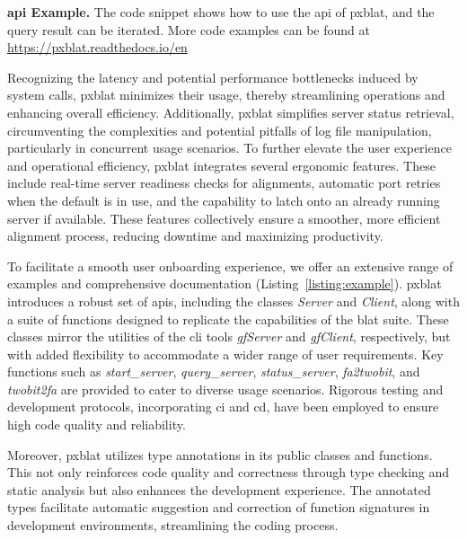 \documentclass[10pt,letterpaper]{article}
\begin{document}
\begin{listing}
	\inputminted[breaklines]{python}{code/example1.py}
	\caption{{\bf \gls{api} Example.} The code snippet shows how to use the \gls{api} of \gls{pxblat},
		and the query result can be iterated. More code examples can be found at \url{https://pxblat.readthedocs.io/en}}
	\label{listing:example}
\end{listing}

Recognizing the latency and potential performance bottlenecks induced by system calls, \gls{pxblat} minimizes their usage, thereby streamlining operations and enhancing overall efficiency.
Additionally, \gls{pxblat} simplifies server status retrieval, circumventing the complexities and potential pitfalls of log file manipulation, particularly in concurrent usage scenarios.
To further elevate the user experience and operational efficiency, \gls{pxblat} integrates several ergonomic features.
These include real-time server readiness checks for alignments, automatic port retries when the default is in use, and the capability to latch onto an already running server if available.
These features collectively ensure a smoother, more efficient alignment process, reducing downtime and maximizing productivity.

To facilitate a smooth user onboarding experience, we offer an extensive range of examples and comprehensive documentation (Listing~\ref{listing:example}).
\gls{pxblat} introduces a robust set of \glspl{api}, including the classes \emph{Server} and \emph{Client}, along with a suite of functions designed to replicate the capabilities of the \gls{blat} suite.
These classes mirror the utilities of the \gls{cli} tools \emph{gfServer} and \emph{gfClient}, respectively, but with added flexibility to accommodate a wider range of user requirements.
Key functions such as \emph{start\_server}, \emph{query\_server}, \emph{status\_server}, \emph{fa2twobit}, and \emph{twobit2fa} are provided to cater to diverse usage scenarios.
Rigorous testing and development protocols, incorporating \gls{ci} and \gls{cd}, have been employed to ensure high code quality and reliability.

Moreover, \gls{pxblat} utilizes type annotations in its public classes and functions.
This not only reinforces code quality and correctness through type checking and static analysis but also enhances the development experience.
The annotated types facilitate automatic suggestion and correction of function signatures in development environments, streamlining the coding process.
\end{document}
